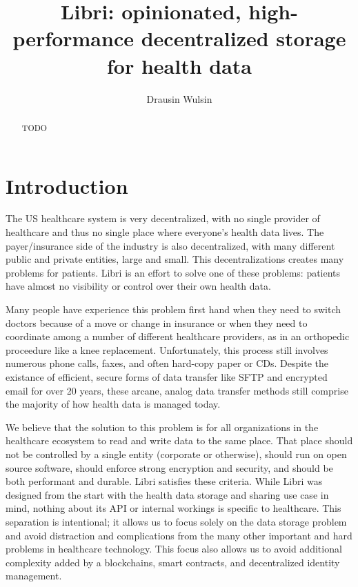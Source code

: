 \documentclass[10pt]{article}
\begin{document}
\title{Libri: opinionated, high-performance decentralized storage for health data}
\author{Drausin Wulsin}
\maketitle

\begin{abstract}
TODO
\end{abstract}

\section{Introduction}

The US healthcare system is very decentralized, with no single provider of healthcare and thus no single place where everyone's health data lives. The payer/insurance side of the industry is also decentralized, with many different public and private entities, large and small. This decentralizations creates many problems for patients. Libri is an effort to solve one of these problems: patients have almost no visibility or control over their own health data.

Many people have experience this problem first hand when they need to switch doctors because of a move or change in insurance or when they need to coordinate among a number of different healthcare providers, as in an orthopedic proceedure like a knee replacement. Unfortunately, this process still involves numerous phone calls, faxes, and often hard-copy paper or CDs. Despite the existance of efficient, secure forms of data transfer like SFTP and encrypted email for over 20 years, these arcane, analog data transfer methods still comprise the majority of how health data is managed today. 

We believe that the solution to this problem is for all organizations in the healthcare ecosystem to read and write data to the same place. That place should not be controlled by a single entity (corporate or otherwise), should run on open source software, should enforce strong encryption and security, and should be both performant and durable. Libri satisfies these criteria. While Libri was designed from the start with the health data storage and sharing use case in mind, nothing about its API or internal workings is specific to healthcare. This separation is intentional; it allows us to focus solely on the data storage problem and avoid distraction and complications from the many other important and hard problems in healthcare technology. This focus also allows us to avoid additional complexity added by a blockchains, smart contracts, and decentralized identity management.
\end{document}
